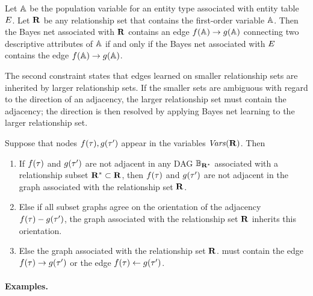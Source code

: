 \begin{constraint} \label{clause:econstraints} Let $\mathbb{A}$ be the population variable for an entity type associated with entity table $E$. Let $\mathbf{R}$ be any relationship set that contains the first-order variable $\mathbb{A}$. Then the Bayes net associated with $\mathbf{R}$ contains an edge $f(\mathbb{A}) \rightarrow g(\mathbb{A})$ connecting two descriptive attributes of $\mathbb{A}$ if and only if the Bayes net associated with $E$ contains the edge $f(\mathbb{A}) \rightarrow g(\mathbb{A})$.
\end{constraint}

The second constraint states that edges learned on smaller relationship sets are inherited by larger relationship sets. If the smaller sets are ambiguous with regard to the direction of an adjacency, the larger relationship set must contain the adjacency; the direction is then resolved by applying Bayes net learning to the larger relationship set.

\begin{constraint} \label{clause:rconstraints} Suppose that nodes $f(\mathbf{\tau}),g(\mathbf{\tau}')$ appear in the variables $\it{Vars}(\mathbf{R})$. %
Then
\begin{enumerate}
\item  If $f(\mathbf{\tau})$ and $g(\mathbf{\tau}')$ are not adjacent in any DAG $\mathbb{B}_{\mathbf{R}^{*}}$ associated with a relationship subset $\mathbf{R}^{*} \subset \mathbf{R}$, then $f(\mathbf{\tau})$ and $g(\mathbf{\tau}')$ are not adjacent in the graph associated with the relationship set $\mathbf{R}$.
\item Else if all subset graphs agree on the orientation of the adjacency  $f(\mathbf{\tau})-g(\mathbf{\tau}')$, the graph associated with the relationship set $\mathbf{R}$ inherits this orientation.
\item Else the graph associated with the relationship set $\mathbf{R}$. must contain the edge $f(\mathbf{\tau}) \rightarrow g(\mathbf{\tau}')$ or the edge $f(\mathbf{\tau}) \leftarrow g(\mathbf{\tau}')$.
\end{enumerate}
\end{constraint}

\paragraph{Examples.}

